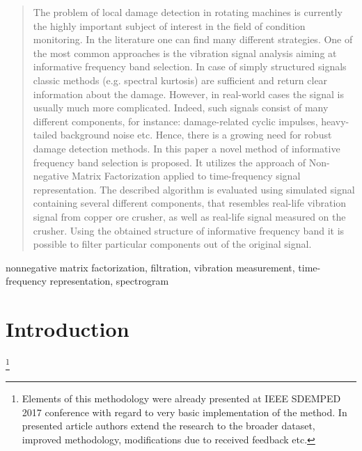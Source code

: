 \documentclass[journal]{IEEEtran}
\newcommand\blfootnote[1]{%
  \begingroup
  \renewcommand\thefootnote{}\footnote{#1}%
  \addtocounter{footnote}{-1}%
  \endgroup
}
\begin{document}
\begin{abstract}
The problem of local damage detection in rotating machines is currently the highly important subject of interest in the field of condition monitoring. In the literature one can find many different strategies. One of the most common approaches is the vibration signal analysis aiming at informative frequency band selection. In case of simply structured signals classic methods (e.g. spectral kurtosis) are sufficient and return clear information about the damage. However, in real-world cases the signal is usually much more complicated. Indeed, such signals consist of many different components, for instance: damage-related cyclic impulses, heavy-tailed background noise etc. Hence, there is a growing need for robust damage detection methods. In this paper a novel method of informative frequency band selection is proposed. It utilizes the approach of Non-negative Matrix Factorization applied to time-frequency signal representation. The described algorithm is evaluated using simulated signal containing several different components, that resembles real-life vibration signal from copper ore crusher, as well as real-life signal measured on the crusher. Using the obtained structure of informative frequency band it is possible to filter particular components out of the original signal.
\end{abstract}

\begin{IEEEkeywords}
nonnegative matrix factorization, filtration, vibration measurement, time-frequency representation, spectrogram
\end{IEEEkeywords}



\IEEEpeerreviewmaketitle



\section{Introduction}
\blfootnote{Elements of this methodology were already presented at IEEE SDEMPED 2017 conference \cite{wodecki2017novel} with regard to very basic implementation of the method. In presented article authors extend the research to the broader dataset, improved methodology, modifications due to received feedback etc.}
\end{document}
